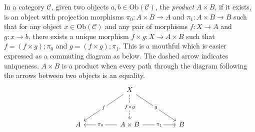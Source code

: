 \begin{defn}
In a category $\mathcal{C}$, given two objects $a,b \in \text{Ob}(\mathcal{C})$, the \emph{product} $A \times B$, if it exists, is an object with projection morphisms $\pi_0: A \times B \rightarrow A$ and $\pi_1: A \times B \rightarrow B$ such that for any object $x \in \text{Ob}(\mathcal{C})$ and any pair of morphisms $f: X \rightarrow A$ and $g: x \rightarrow b$, there exists a unique morphism $f \times g: X \rightarrow A \times B$ such that $f = (f \times g) ; \pi_0$ and $g = (f \times g); \pi_1$. This is a mouthful which is easier expressed as a commuting diagram as below. The dashed arrow indicates uniqueness. $A \times B$ is a product when every path through the diagram following the arrows between two objects is an equality.
\[\begin{tikzcd}
	&& X \\
	\\
	A && {A \times B} && B
	\arrow["{f \times g}"{description}, dashed, from=1-3, to=3-3]
	\arrow["f"{description}, from=1-3, to=3-1]
	\arrow["g"{description}, from=1-3, to=3-5]
	\arrow["{\pi_1}"{description}, from=3-3, to=3-5]
	\arrow["{\pi_0}"{description}, from=3-3, to=3-1]
\end{tikzcd}\]

\end{defn}

